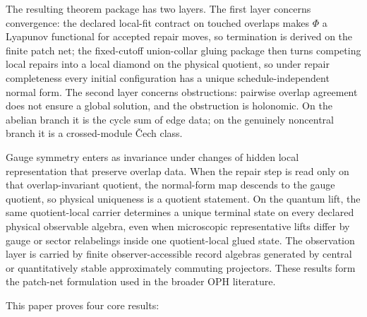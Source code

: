 \documentclass[11pt]{article}
\theoremstyle{remark}
\theoremstyle{plain}
\begin{document}
The resulting theorem package has two layers. The first layer concerns convergence: the declared
local-fit contract on touched overlaps makes \(\Phi\) a Lyapunov functional for accepted repair
moves, so termination is derived on the finite patch net; the fixed-cutoff union-collar gluing
package then turns competing local repairs into a local diamond on the physical quotient, so
under repair completeness every initial configuration has a unique schedule-independent normal
form. The second layer concerns obstructions: pairwise overlap agreement does not ensure a
global solution, and the obstruction is holonomic. On the abelian branch it is the cycle sum of
edge data; on the genuinely noncentral branch it is a crossed-module \v{C}ech class.

Gauge symmetry enters as invariance under changes of hidden local representation that preserve
overlap data. When the repair step is read only on that overlap-invariant quotient, the
normal-form map descends to the gauge quotient, so physical uniqueness is a quotient statement.
On the quantum lift, the same quotient-local carrier determines a unique terminal state on every
declared physical observable algebra, even when microscopic representative lifts differ by gauge
or sector relabelings inside one quotient-local glued state.
The observation layer is carried by finite observer-accessible record algebras generated by
central or quantitatively stable approximately commuting projectors. These results form the
patch-net formulation used in the broader OPH literature.

This paper proves four core results:
\end{document}
